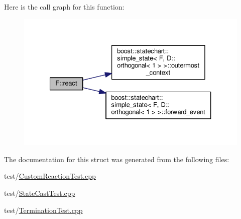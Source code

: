 Here is the call graph for this function\+:
\nopagebreak
\begin{figure}[H]
\begin{center}
\leavevmode
\includegraphics[width=327pt]{struct_f_a31458675be8c5ab2c2bfb59512386c72_cgraph}
\end{center}
\end{figure}


The documentation for this struct was generated from the following files\+:\begin{DoxyCompactItemize}
\item 
test/\mbox{\hyperlink{_custom_reaction_test_8cpp}{Custom\+Reaction\+Test.\+cpp}}\item 
test/\mbox{\hyperlink{_state_cast_test_8cpp}{State\+Cast\+Test.\+cpp}}\item 
test/\mbox{\hyperlink{_termination_test_8cpp}{Termination\+Test.\+cpp}}\end{DoxyCompactItemize}
